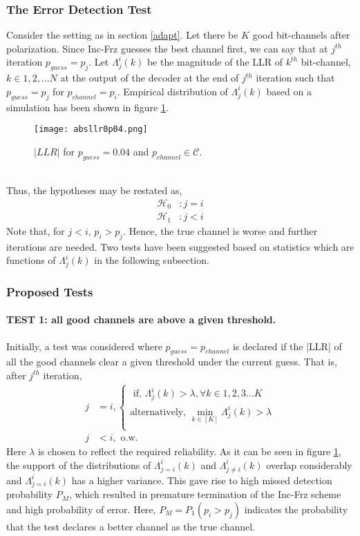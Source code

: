 \documentclass[
11pt, %
a4paper, %
oneside, %
headinclude,footinclude, %
BCOR5mm, %
]{scrartcl}
\begin{document}
\subsubsection{The Error Detection Test }
Consider the setting as in section \ref{adapt}. Let there be $K$ good bit-channels after polarization.  
Since Inc-Frz guesses the best channel first, we can say that at $j^{th}$ iteration $p_{guess}=p_j$. 
Let $\Lambda_j^i(k)$ be the magnitude of the LLR of $k^{th}$ bit-channel, $k\in{1,2,...N}$ at the output of the decoder at the end of $j^{th}$ iteration such that $p_{guess}=p_j$ for $p_{channel}=p_i$. Empirical distribution of $\Lambda_j^i(k)$ based on a simulation has been shown in figure \ref{fig:absllr}.
\begin{figure}[h]
 \begin{center}
    \texttt{[image: absllr0p04.png]}
  \end{center}
  \caption{$|LLR|$ for $p_{guess}=0.04$ and $p_{channel} \in \mathcal{C}$.}
  \label{fig:absllr}
\end{figure}\\
Thus, the hypotheses may be restated as,
\begin{align*}
\mathcal{H}_0 & :j=i\\
\mathcal{H}_1 & :j<i
\end{align*}
Note that, for $j < i$, $p_i > p_j$. Hence, the true channel is worse and further iterations are needed. Two tests have been suggested based on statistics which are functions of  $\Lambda_j^i(k)$ in the following subsection.

\subsubsection{Proposed Tests}
\paragraph{TEST 1: all good channels are above a given threshold.} Initially, a test was considered where $p_{guess}=p_{channel}$ is declared if the |LLR| of all the good channels clear a given threshold under the current guess. That is, after $j^{th}$ iteration,
\begin{align*}  
j & =i, 
\begin{cases}
\text{   if, }  \Lambda_{j}^i(k) > \lambda, \forall k \in {1,2,3...K}\\
\text{alternatively, } \displaystyle\min_{k \in [K]}\Lambda_{j}^i(k) > \lambda  \\
\end{cases}\\
 j & < i,  \text{ o.w.}
\end{align*} 
Here $\lambda$ is chosen to reflect the required reliability. As it can be seen in figure \ref{fig:absllr}, the support of the distributions of $\Lambda_{j=i}^i(k)$ and $\Lambda_{j \neq i}^i(k)$ overlap considerably and $\Lambda_{j=i}^i(k)$ has a higher variance. This gave rise to high missed detection probability $P_M$, which resulted in premature termination of the Inc-Frz scheme and high probability of error. Here, $P_M=P_1(p_i>p_j)$ indicates the probability that the test declares a better channel as the true channel.
\end{document}
